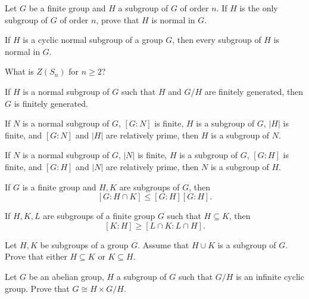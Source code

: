 \documentclass[addpoints,10pt]{exam}
\theoremstyle{plain}
\theoremstyle{definition}
\newtheorem{prob}[thm]{Problem}
\theoremstyle{plain}
\theoremstyle{plain}
\theoremstyle{definition}
\let\oldprob\prob
\let\endoldprob\endprob
\renewenvironment{prob}
  {\begin{singlespace}\oldprob}
  {\endoldprob\end{singlespace}}
\begin{document}
\begin{prob}
Let $G$ be a finite group and $H$ a subgroup of $G$ of order $n$. If $H$ is the only subgroup of $G$ of order $n$, prove that $H$ is normal in $G$.
\end{prob}

\begin{prob}
If $H$ is a cyclic normal subgroup of a group $G$, then every subgroup of $H$ is normal in $G$.
\end{prob}

\begin{prob}
What is $Z(S_n)$ for $n \ge 2$?
\end{prob}

\begin{prob}
If $H$ is a normal subgroup of $G$ such that $H$ and $G/H$ are finitely generated, then $G$ is finitely generated.
\end{prob}

\begin{prob}
If $N$ is a normal subgroup of $G$, $[G:N]$ is finite, $H$ is a subgroup of $G$, $|H|$ is finite, and $[G:N]$ and $|H|$ are relatively prime, then $H$ is a subgroup of $N$.
\end{prob}

\begin{prob}
If $N$ is a normal subgroup of $G$, $|N|$ is finite, $H$ is a subgroup of $G$, $[G:H]$ is finite, and $[G:H]$ and $|N|$ are relatively prime, then $N$ is a subgroup of $H$.
\end{prob}

\begin{prob}
If $G$ is a finite group and $H,K$ are subgroups of $G$, then
\[
[G:H\cap K] \le [G:H][G:H].
\]
\end{prob}

\begin{prob}
If $H,K,L$ are subgroups of a finite group $G$ such that $H\subseteq K$, then
\[
[K:H] \ge [L\cap K : L\cap H].
\]
\end{prob}

\begin{prob}
Let $H,K$ be subgroups of a group $G$. Assume that $H\cup K$ is a subgroup of $G$. Prove that either $H\subseteq K$ or $K\subseteq H$.
\end{prob}

\begin{prob}
Let $G$ be an abelian group, $H$ a subgroup of $G$ such that $G/H$ is an infinite cyclic group. Prove that $G \cong H \times G/H$.
\end{prob}
\end{document}
